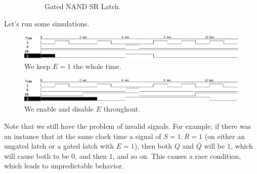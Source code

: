 \begin{definition}
\begin{figure}[H]
\begin{subfigure}[b]{0.48\textwidth}
        \caption{Gated NAND SR Latch.}
      \end{subfigure}
      \caption{}
    \end{figure}
  \end{definition}

  \begin{example}
    Let's run some simulations. 

    \begin{figure}[H]
      \centering 
      \includegraphics[width=\textwidth]{img/gated_sr1.png}
      \caption{We keep $E=1$ the whole time.} 
    \end{figure}

    \begin{figure}[H]
      \centering 
      \includegraphics[width=\textwidth]{img/gated_sr2.png}
      \caption{We enable and disable $E$ throughout.} 
    \end{figure}
  \end{example}

  Note that we still have the problem of invalid signals. For example, if there was an instance that at the same clock time a signal of $S=1, R=1$ (on either an ungated latch or a gated latch with $E=1$), then both $Q$ and $\overline{Q}$ will be $1$, which will cause both to be $0$, and then $1$, and so on. This causes a race condition, which leads to unpredictable behavior. 

